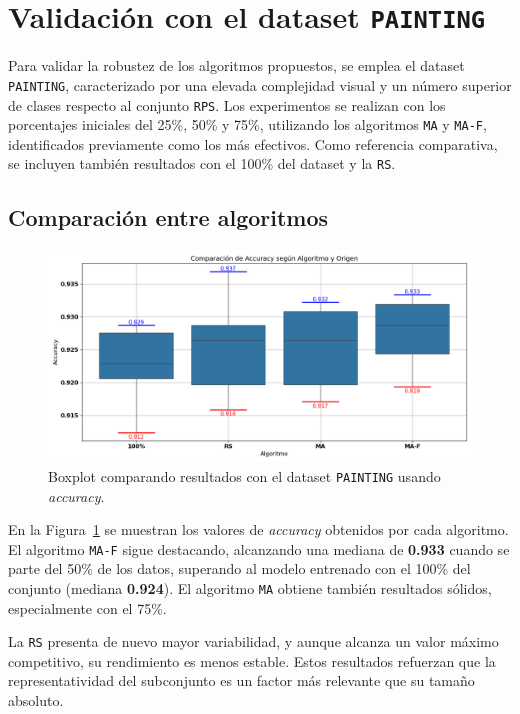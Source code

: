 \section{Validación con el dataset \texttt{PAINTING}}\label{sec:validacion-con-painting}
Para validar la robustez de los algoritmos propuestos, se emplea el dataset \texttt{PAINTING},
caracterizado por una elevada complejidad visual y un número superior de clases respecto al conjunto \texttt{RPS}.
Los experimentos se realizan con los porcentajes iniciales del 25\%, 50\% y 75\%, utilizando los algoritmos \texttt{MA} y \texttt{MA-F}, identificados previamente como los más efectivos.
Como referencia comparativa, se incluyen también resultados con el 100\% del dataset y la \texttt{RS}.

\subsection{Comparación entre algoritmos}

\begin{figure}[htp]
    \centering
    \includegraphics[width=1\textwidth]{imagenes/evaluaciones/painting/comparacion-por-algoritmo.png}
    \caption{Boxplot comparando resultados con el dataset \texttt{PAINTING} usando \textit{accuracy}.}
    \label{fig:comparacion-por-algoritmo}
\end{figure}

En la Figura~\ref{fig:comparacion-por-algoritmo} se muestran los valores de \textit{accuracy} obtenidos por cada algoritmo.
El algoritmo \texttt{MA-F} sigue destacando, alcanzando una mediana de \textbf{0.933} cuando se parte del 50\% de los datos,
superando al modelo entrenado con el 100\% del conjunto (mediana \textbf{0.924}).
El algoritmo \texttt{MA} obtiene también resultados sólidos, especialmente con el 75\%.

La \texttt{RS} presenta de nuevo mayor variabilidad, y aunque alcanza un valor máximo competitivo, su rendimiento es menos estable.
Estos resultados refuerzan que la representatividad del subconjunto es un factor más relevante que su tamaño absoluto.

